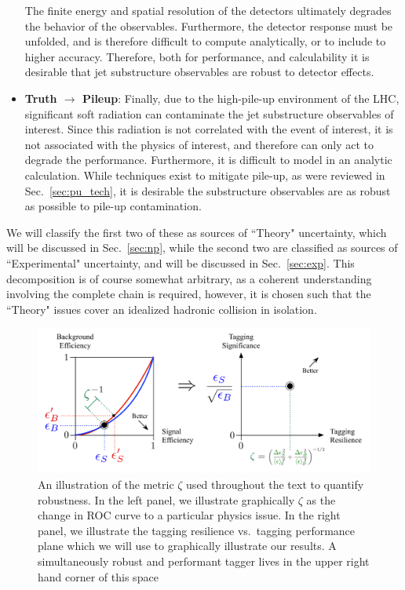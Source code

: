 \documentclass[11pt,letterpaper]{article}
\DeclareRobustCommand{\Sec}[1]{Sec.~\ref{#1}}
\begin{document}
\begin{itemize}
%
The finite energy and spatial resolution of the detectors ultimately degrades the behavior of the observables.
%
Furthermore, the detector response must be unfolded, and is therefore difficult to compute analytically, or to include to higher accuracy. Therefore, both for performance, and calculability it is desirable that jet substructure observables are robust to detector effects.
%
\item {\bf Truth $\to$ Pileup}: Finally, due to the high-pile-up environment of the LHC, significant soft radiation can contaminate the jet substructure observables of interest.
%
Since this radiation is not correlated with the event of interest, it is not associated with the physics of interest, and therefore can only act to degrade the performance.
%
Furthermore, it is difficult to model in an analytic calculation.
%
While techniques exist to mitigate pile-up, as were reviewed in \Sec{sec:pu_tech}, it is desirable the substructure observables are as robust as possible to pile-up contamination.
%
\end{itemize}
%
We will classify the first two of these as sources of ``Theory" uncertainty, which will be discussed in \Sec{sec:np}, while the second two are classified as sources of ``Experimental" uncertainty, and will be discussed in \Sec{sec:exp}. This decomposition is of course somewhat arbitrary, as a coherent understanding involving the complete chain is required, however, it is chosen such that the ``Theory" issues cover an idealized hadronic collision in isolation. 

\begin{figure}[t]
\begin{center}
\includegraphics[width=1.0\columnwidth]{figures/roc_to_significance}
\end{center}
\caption{An illustration of the metric $\zeta$ used throughout the text to quantify robustness. In the left panel, we illustrate graphically $\zeta$ as the change in ROC curve to a particular physics issue. In the right panel, we illustrate the tagging resilience vs.\ tagging performance plane which we will use to graphically illustrate our results.  A simultaneously robust and performant tagger lives in the upper right hand corner of this space}
\label{fig:zeta_def}
\end{figure}
\end{document}
